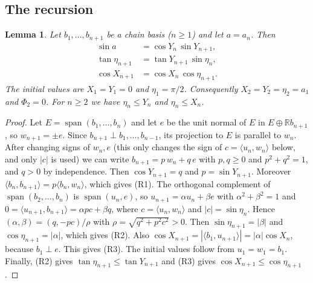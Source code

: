 \documentclass[11pt]{article}
\newtheorem{lemma}[theorem]{Lemma}
\theoremstyle{remark}
\begin{document}
\subsection{The recursion}
\begin{lemma}\label{lem:rec}
Let $b_1,\dots,b_{n+1}$ be a chain basis ($n\ge1$) and let
$a=a_n$. Then
\begin{align}
\sin a&=\cos Y_n\,\sin Y_{n+1},\tag{R1}\\
\tan\eta_{n+1}&=\tan Y_{n+1}\,\sin\eta_n,\tag{R2}\\
\cos X_{n+1}&=\cos X_n\,\cos\eta_{n+1}.\tag{R3}
\end{align}
The initial values are $X_1=Y_1=0$ and $\eta_1=\pi/2$. Consequently $X_2=Y_2=\eta_2=a_1$ and
$\Phi_2=0$. For $n\ge2$ we have $\eta_n\le Y_n$ and $\eta_n\le X_n$.
\end{lemma}
\begin{proof}
Let $E=\operatorname{span}(b_1,\dots,b_n)$ and let $e$ be the unit normal of $E$
in $E\oplus\mathbb R b_{n+1}$, so $w_{n+1}=\pm e$. Since
$b_{n+1}\perp b_1,\dots,b_{n-1}$, its projection to $E$ is parallel to
$w_n$. After changing signs of $w_n,e$ (this only changes the sign of $c=\langle u_n,w_n\rangle$ below, and only $|c|$ is used) we can write $b_{n+1}=p\,w_n+q\,e$ with $p,q\ge0$ and
$p^2+q^2=1$, and $q>0$ by independence. Then $\cos Y_{n+1}=q$ and $p=\sin Y_{n+1}$.
Moreover $\langle b_n,b_{n+1}\rangle=p\langle b_n,w_n\rangle$, which gives
(R1). The orthogonal complement of $\operatorname{span}(b_2,\dots,b_n)$
is $\operatorname{span}(u_n,e)$, so
$u_{n+1}=\alpha u_n+\beta e$ with $\alpha^2+\beta^2=1$ and
$0=\langle u_{n+1},b_{n+1}\rangle=\alpha pc+\beta q$, where
$c=\langle u_n,w_n\rangle$ and $|c|=\sin\eta_n$. Hence
$(\alpha,\beta)=(q,-pc)/\rho$ with $\rho=\sqrt{q^2+p^2c^2}>0$. Then
$\sin\eta_{n+1}=|\beta|$ and $\cos\eta_{n+1}=|\alpha|$, which gives (R2).
Also $\cos X_{n+1}=|\langle b_1,u_{n+1}\rangle|=|\alpha|\cos X_n$, because
$b_1\perp e$. This gives (R3). The initial values follow from $u_1=w_1=b_1$.
Finally, (R2) gives $\tan\eta_{n+1}\le\tan Y_{n+1}$ and (R3) gives
$\cos X_{n+1}\le\cos\eta_{n+1}$.
\end{proof}
\end{document}

